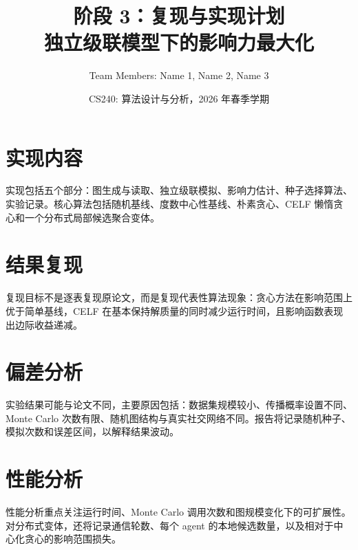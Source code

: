 \documentclass[UTF8, 11pt]{ctexart}
\title{\textbf{阶段 3：复现与实现计划}\\
独立级联模型下的影响力最大化}
\author{Team Members: Name 1, Name 2, Name 3}
\date{CS240: 算法设计与分析，2026 年春季学期}
\begin{document}
\maketitle

\section{实现内容}

实现包括五个部分：图生成与读取、独立级联模拟、影响力估计、种子选择算法、实验记录。核心算法包括随机基线、度数中心性基线、朴素贪心、CELF 懒惰贪心和一个分布式局部候选聚合变体。

\section{结果复现}

复现目标不是逐表复现原论文，而是复现代表性算法现象：贪心方法在影响范围上优于简单基线，CELF 在基本保持解质量的同时减少运行时间，且影响函数表现出边际收益递减。

\section{偏差分析}

实验结果可能与论文不同，主要原因包括：数据集规模较小、传播概率设置不同、Monte Carlo 次数有限、随机图结构与真实社交网络不同。报告将记录随机种子、模拟次数和误差区间，以解释结果波动。

\section{性能分析}

性能分析重点关注运行时间、Monte Carlo 调用次数和图规模变化下的可扩展性。对分布式变体，还将记录通信轮数、每个 agent 的本地候选数量，以及相对于中心化贪心的影响范围损失。
\end{document}
